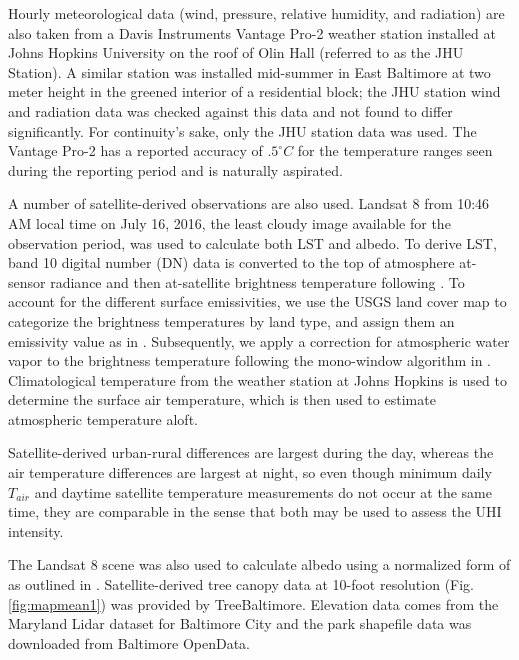 Hourly meteorological data (wind, pressure, relative humidity, and radiation) are also taken from a Davis Instruments Vantage Pro-2 weather station installed at Johns Hopkins University on the roof of Olin Hall (referred to as the JHU Station). A similar station was installed mid-summer in East Baltimore at two meter height in the greened interior of a residential block; the JHU station wind and radiation data was checked against this data and not found to differ significantly. For continuity's sake, only the JHU station data was used. 
The Vantage Pro-2 has a reported accuracy of $ .5^{\circ} C $ for the temperature ranges seen during the reporting period and is naturally aspirated. 

A number of satellite-derived observations are also used. Landsat 8 \citep{landsat8} from 10:46 AM local time on July 16, 2016, the least cloudy image available for the observation period, was used to calculate both LST and albedo. 
To derive LST, band 10 digital number (DN) data is converted to the top of atmosphere at-sensor radiance and then at-satellite brightness temperature following \citep{LSTalgorithm}. To account for the different surface emissivities, we use the USGS land cover map to categorize the brightness temperatures by land type, and assign them an emissivity value as in \citet{alipour2003land}.
Subsequently, we apply a correction for atmospheric water vapor to the brightness temperature following the mono-window algorithm in \citet{doi:10.1080/01431160010006971}. Climatological temperature from the weather station at Johns Hopkins is used to determine the surface air temperature, which is then used to estimate atmospheric temperature aloft.    
 
Satellite-derived urban-rural differences are largest during the day, whereas the air temperature differences are largest at night, so even though minimum daily $T_{air}$ and daytime satellite temperature measurements do not occur at the same time, they are comparable in the sense that both may be used to assess the UHI intensity. 

The Landsat 8 scene was also used to calculate albedo using a normalized form of \citet{albedoLiang2001} as outlined in \citet{albedoRonSmith}. Satellite-derived tree canopy data at 10-foot resolution (Fig. \ref{fig:mapmean1}) was provided by TreeBaltimore. Elevation data comes from the Maryland Lidar dataset for Baltimore City \citep{marylandelevation} and the park shapefile data was downloaded from Baltimore OpenData.  

